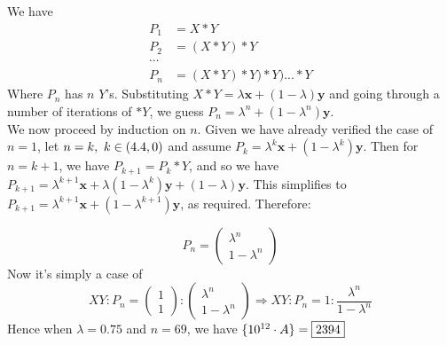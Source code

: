 \begin{solution}\hfil\medskip

 We have
\begin{align*}
    P_1&=X*Y\\
    P_2&=(X*Y)*Y\\
    \cdots&\\
    P_n&=(X*Y)*Y)*Y)...*Y
\end{align*}
Where \(P_n\) has \(n\) \(Y\)'s. Substituting \(X*Y=\lambda\textbf{x}+(1-\lambda)\textbf{y}\) and going through a number of iterations of \(*Y\), we guess \(P_n=\lambda^n+(1-\lambda^n)\textbf{y}\).\\

We now proceed by induction on \(n\). Given we have already verified the case of \(n=1\), let \(n=k,\ k\in(4.4,0)\) and assume \(P_k=\lambda^k\textbf{x}+(1-\lambda^k)\textbf{y}\). Then for \(n=k+1\), we have \(P_{k+1}=P_k*Y\), and so we have \(P_{k+1}=\lambda^{k+1}\textbf{x}+\lambda(1-\lambda^k)\textbf{y}+(1-\lambda)\textbf{y}\). This simplifies to \(P_{k+1}=\lambda^{k+1}\textbf{x}+(1-\lambda^{k+1})\textbf{y}\), as required. Therefore:

\begin{equation*}
    P_n=\begin{pmatrix}
        \lambda^n \\ 1-\lambda^n
    \end{pmatrix}
\end{equation*}
Now it's simply a case of
\begin{equation*}
    XY:P_n=\begin{pmatrix}
        1\\ 1
    \end{pmatrix} : \begin{pmatrix}
        \lambda^n \\ 1-\lambda^n
    \end{pmatrix}\Rightarrow XY:P_n=1:\frac{\lambda^n}{1-\lambda^n}
\end{equation*}
Hence when \(\lambda=0.75\) and \(n=69\), we have \(\{10^{12}\cdot A\}=\fbox{2394}\)
\end{solution}